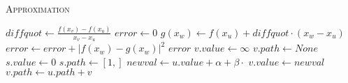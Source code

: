 \documentclass[a4paper]{scrartcl}
\begin{document}
\begin{enumerate}[(a)]
        \begin{algorithm}
            \caption{\textsc{Approximation}}
            \label{alg:dag-bf}
            \begin{algorithmic}[1]
                    \State $diffquot \gets \frac{f(x_v) - f(x_u)}{x_v - x_u}$
                    \State $error \gets 0$
                        \State $g(x_w) \gets f(x_u) + diffquot \cdot (x_w - x_u)$
                        \State $error \gets error + \left\vert f(x_w) - g(x_w) \right\vert^2$
                    \EndFor
                    \State \Return $error$
                \EndProcedure
                \Statex
                        \State $v.value \gets \infty$
                        \State $v.path \gets None$
                    \EndFor
                    \State $s.value \gets 0$
                    \State $s.path \gets [1,]$
                \EndProcedure
                \Statex
                    \State $newval \gets u.value + \alpha + \beta \cdot $ 
                        \State $v.value \gets newval$
                        \State $v.path \gets u.path + v$
                    \EndIf
                \EndProcedure
                \Statex
                    \State {}
                            \State {}
                        \EndFor
                    \EndFor
                \EndProcedure
            \end{algorithmic}
        \end{algorithm}


\end{enumerate}
\end{document}
